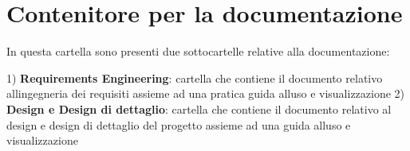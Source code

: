 \chapter{Contenitore per la documentazione}
\hypertarget{md_docs_2readme}{}\label{md_docs_2readme}
\label{md_docs_2readme_autotoc_md1}%
%


In questa cartella sono presenti due sottocartelle relative alla documentazione\+:

1) {\bfseries{Requirements Engineering}}\+: cartella che contiene il documento relativo all\textquotesingle{}ingegneria dei requisiti assieme ad una pratica guida all\textquotesingle{}uso e visualizzazione 2) {\bfseries{Design e Design di dettaglio}}\+: cartella che contiene il documento relativo al design e design di dettaglio del progetto assieme ad una guida all\textquotesingle{}uso e visualizzazione 